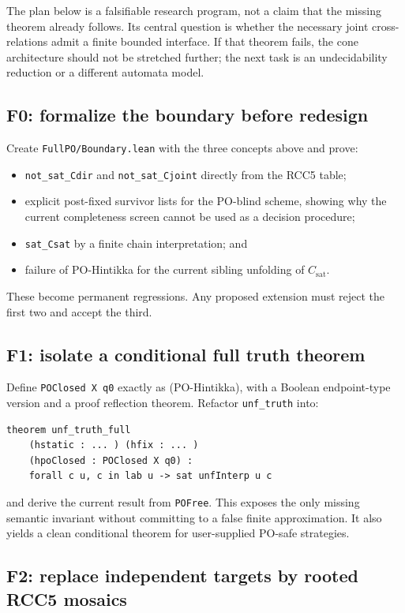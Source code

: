 \documentclass[11pt]{article}
\newcommand{\code}[1]{\texttt{#1}}
\begin{document}
The plan below is a falsifiable research program, not a claim that the missing theorem
already follows. Its central question is whether the necessary joint cross-relations
admit a finite bounded interface. If that theorem fails, the cone architecture should
not be stretched further; the next task is an undecidability reduction or a different
automata model.

\subsection{F0: formalize the boundary before redesign}

Create \code{FullPO/Boundary.lean} with the three concepts above and prove:
\begin{itemize}
  \item \code{not\_sat\_Cdir} and \code{not\_sat\_Cjoint} directly from the RCC5 table;
  \item explicit post-fixed survivor lists for the PO-blind scheme, showing why the
  current completeness screen cannot be used as a decision procedure;
  \item \code{sat\_Csat} by a finite chain interpretation; and
  \item failure of PO-Hintikka for the current sibling unfolding of $C_{\mathrm{sat}}$.
\end{itemize}
These become permanent regressions. Any proposed extension must reject the first two
and accept the third.

\subsection{F1: isolate a conditional full truth theorem}

Define \code{POClosed X q0} exactly as (PO-Hintikka), with a Boolean endpoint-type
version and a proof reflection theorem. Refactor \code{unf\_truth} into:
\begin{lstlisting}
theorem unf_truth_full
    (hstatic : ... ) (hfix : ... )
    (hpoClosed : POClosed X q0) :
    forall c u, c in lab u -> sat unfInterp u c
\end{lstlisting}
and derive the current result from \code{POFree}. This exposes the only missing semantic
invariant without committing to a false finite approximation. It also yields a clean
conditional theorem for user-supplied PO-safe strategies.

\subsection{F2: replace independent targets by rooted RCC5 mosaics}
\end{document}
